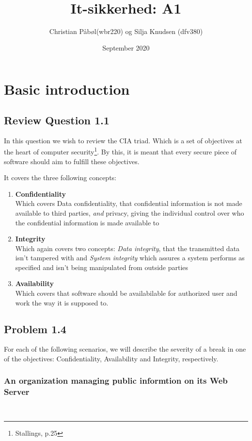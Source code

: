 \documentclass{article}
\title{It-sikkerhed: A1}
\author{Christian Påbøl(wbr220) og Silja Knudsen (dfv380) }
\date{September 2020}
\begin{document}
\maketitle

\section{Basic introduction}
\subsection{Review Question 1.1}
In this question we wish to review the CIA triad. Which is a set of objectives at the heart of 
computer security\footnote{Stallings, p.25}. By this, it is meant that every secure piece of software should aim to fulfill these objectives.

It covers the three following concepts:
\begin{enumerate}
    \item \textbf{Confidentiality}\\
        Which covers Data confidentiality, that confidential information is not made available to third
        parties, \emph{and} privacy, giving the individual control over who the confidential information
        is made available to
    \item \textbf{Integrity}\\
        Which again covers two concepts: \emph{Data integrity}, that the transmitted data isn't
        tampered with and \emph{System integrity} which assures a system performs as specified
        and isn't being manipulated from outside parties
    \item \textbf{Availability}\\ Which covers that software should be availabilable for authorized user and work the way it is supposed to.
\end{enumerate}




\subsection{Problem 1.4}
For each of the following scenarios, we will describe the severity of a break
in one of the objectives: Confidentiality, Availability and Integrity, respectively.\\

\subsubsection{An organization managing public informtion on its Web Server}\\
\end{document}
